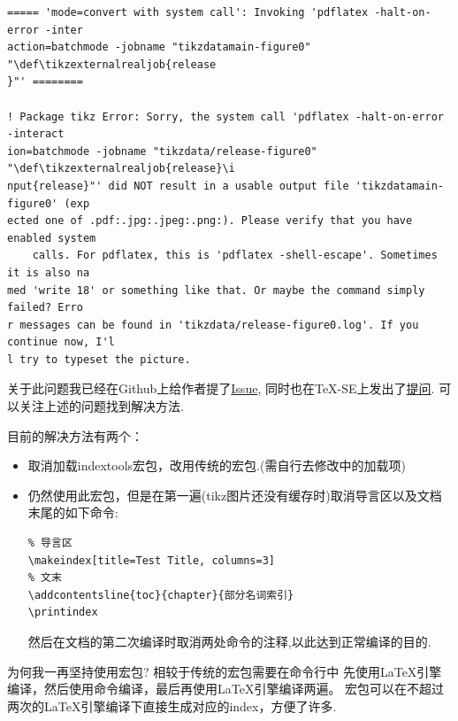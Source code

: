 \begin{verbatim}
===== 'mode=convert with system call': Invoking 'pdflatex -halt-on-error -inter
action=batchmode -jobname "tikzdatamain-figure0" "\def\tikzexternalrealjob{release
}"' ========

! Package tikz Error: Sorry, the system call 'pdflatex -halt-on-error -interact
ion=batchmode -jobname "tikzdata/release-figure0" "\def\tikzexternalrealjob{release}\i
nput{release}"' did NOT result in a usable output file 'tikzdatamain-figure0' (exp
ected one of .pdf:.jpg:.jpeg:.png:). Please verify that you have enabled system
    calls. For pdflatex, this is 'pdflatex -shell-escape'. Sometimes it is also na
med 'write 18' or something like that. Or maybe the command simply failed? Erro
r messages can be found in 'tikzdata/release-figure0.log'. If you continue now, I'l
l try to typeset the picture.
\end{verbatim}

关于此问题我已经在Github上给作者提了\href{https://github.com/maieul/indextools/issues/17}{Issue},
同时也在\TeX-SE上发出了\href{https://tex.stackexchange.com/questions/712716/indextools-confilict-with-tikz-library-external}{提问}.
可以关注上述的问题找到解决方法.

目前的解决方法有两个：
\begin{itemize}
    \item 取消加载indextools宏包，改用传统的宏包.(需自行去修改中的加载项)
    \item 仍然使用此宏包，但是在第一遍(tikz图片还没有缓存时)取消导言区以及文档末尾的如下命令:
\begin{verbatim}
% 导言区
\makeindex[title=Test Title, columns=3]
% 文末
\addcontentsline{toc}{chapter}{部分名词索引}
\printindex
\end{verbatim}
        然后在文档的第二次编译时取消两处命令的注释,以此达到正常编译的目的.
\end{itemize}

\begin{leftbar}
\noindent 为何我一再坚持使用宏包? 相较于传统的宏包需要在命令行中
先使用\LaTeX{}引擎编译，然后使用命令编译，最后再使用\LaTeX{}引擎编译两遍。
宏包可以在不超过两次的\LaTeX{}引擎编译下直接生成对应的index，方便了许多.
\end{leftbar}